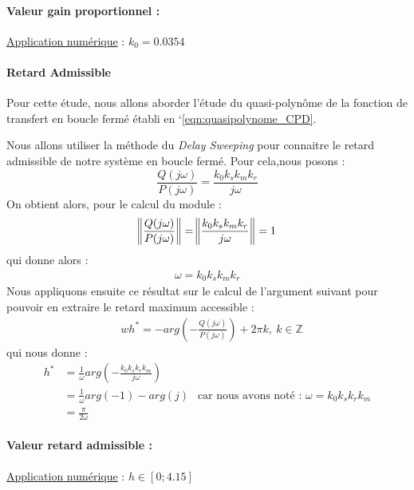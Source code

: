 \paragraph*{Valeur gain proportionnel : }\underline{Application numérique} : $k_0 = 0.0354$
\paragraph*{Retard Admissible}
Pour cette étude, nous allons aborder l'étude du quasi-polynôme de la fonction de transfert en boucle fermé établi en `\ref{eqn:quasipolynome_CPD}. 

Nous allons utiliser la méthode du \emph{Delay Sweeping} pour connaitre le retard admissible de notre système en boucle fermé. Pour cela,nous posons :
\begin{equation}\label{eqn:delaySweepingCorPD}
\frac{Q(j\omega)}{P(j\omega)} = \frac{k_0k_sk_mk_r}{j\omega} 
\end{equation}
On obtient alors, pour le calcul du module :
\begin{align}
\norm{\frac{Q(j\omega)}{P(j\omega)}} 	&= \norm{\frac{k_0k_sk_mk_r}{j\omega}} = 1\\
\end{align}
qui donne alors : 
\begin{align*}
\omega= k_0k_sk_mk_r
\end{align*}
Nous appliquons ensuite ce résultat sur le calcul de l'argument suivant pour pouvoir en extraire le retard maximum accessible : 
\begin{align}
&wh^* = -arg\left(-\frac{Q(j\omega)}{P(j\omega)}\right)+2\pi k,\ k \in  \mathbb{Z}
\end{align}
qui nous donne :
\begin{align*}
h^* &= \frac{1}{\omega}arg\left(-\frac{k_0k_sk_rk_m}{j\omega}\right)\\
	&= \frac{1}{\omega}arg(-1)	- arg(j)\ \ \text{     car nous avons noté : } \omega = k_0k_sk_rk_m\\
	&= \frac{\pi}{2 \omega}
\end{align*}

\paragraph*{Valeur retard admissible : }\underline{Application numérique} : $h \in [0; 4.15]$
